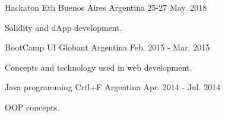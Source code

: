 \begin{cventries}
\cventry
{Hackaton} %
{Eth Buenos Aires} %
{Argentina} %
{25-27 May. 2018} %
{ %
\begin{cvitems}
\item {Solidity and dApp development.}
\end{cvitems}
}
\cventry
{BootCamp UI} %
{Globant} %
{Argentina} %
{Feb. 2015 - Mar. 2015} %
{ %
\begin{cvitems}
\item {Concepts and technology used in web development.}
\end{cvitems}
}
\cventry
{Java programming} %
{Crtl+F} %
{Argentina} %
{Apr. 2014 - Jul. 2014} %
{ %
\begin{cvitems}
\item {OOP concepts.}
\end{cvitems}
}
\end{cventries}
